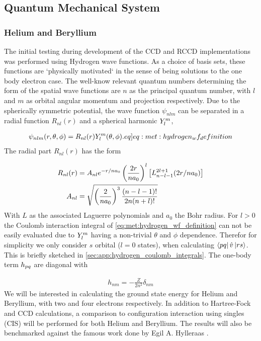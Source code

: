 \subsection{Quantum Mechanical System}

\subsubsection{Helium and Beryllium}
The initial testing during development of the CCD and RCCD implementations was performed using Hydrogen wave functions. As a choice of basis sets, these functions are `physically motivated` in the sense of being solutions to the one body electron case. The well-know relevant quantum numbers determining the form of the spatial wave functions are $n$ as the principal quantum number, with $l$ and $m$ as orbital angular momentum and projection respectively. Due to the spherically symmetric potential, the wave function $\psi_{nlm}$ can be separated in a radial function $R_{nl}(r)$ and a spherical harmonic $Y^{m}_{l}$,  

\begin{align}
    \psi_{nlm}(r,\theta,\phi) = R_{nl}(r) \sphericalharmonic{m}{l}(\theta, \phi). \label[eq]{eq:met:hydrogen_wf_definition}
\end{align}
The radial part $R_{nl}(r)$ has the form

\begin{align*}
    R_{nl}(r) &= A_{nl} e^{-r/na_0} \left(\frac{2r}{na_0}\right)^l \left[L^{2l+1}_{n-l-1}(2r/na_0)\right] \\
    A_{nl} &= \sqrt{ \left(\frac{2}{na_0}\right)^3 \frac{(n-l-1)!}{2n(n+l)!} }
\end{align*}
With $L$ as the associated Laguerre polynomials and $a_0$ the Bohr radius. For $l > 0$ the Coulomb interaction integral of \cref{eq:met:hydrogen_wf_definition} can not be easily evaluated due to $Y^{m}_{l}$ having a non-trivial $\theta$ and $\phi$ dependence. Therefor for simplicity we only consider $s$ orbital ($l=0$ states), when calculating $\bra{pq}\hat{v}\ket{rs}$. This is briefly sketched in \cref{sec:app:hydrogen_coulomb_integrals}. The one-body term $h_{pq}$ are diagonal with 

\begin{align}
    h_{nm} = -\frac{Z}{2n^2}\delta_{nm}
\end{align}
We will be interested in calculating the ground state energy for Helium and Beryllium, with two and four electrons respectively. In addition to Hartree-Fock and CCD calculations, a comparison to configuration interaction using singles (CIS) will be performed for both Helium and Beryllium. The results will also be benchmarked against the famous work done by Egil A. Hylleraas \citep{hylleraasNumerischeBerechnung2STerme1930}.

